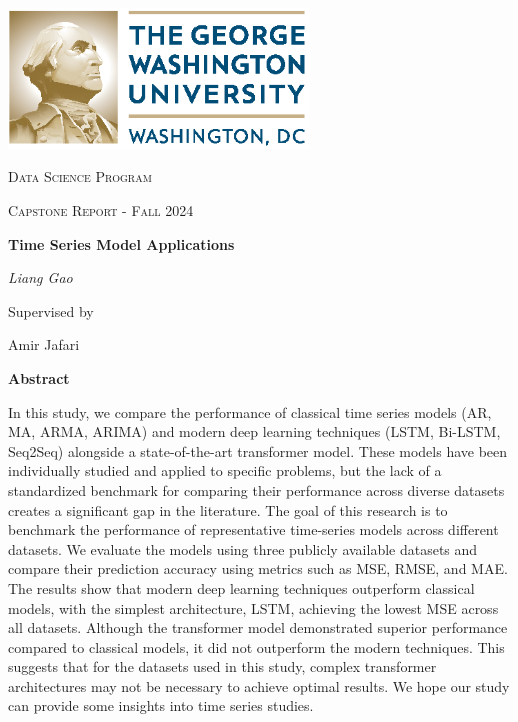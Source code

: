 \documentclass{scrartcl}
\renewenvironment{abstract}{
    \centering
    \textbf{Abstract}
    \vspace{0.5cm}
    \par\itshape
    \begin{minipage}{0.7\linewidth}}{\end{minipage}
    \noindent\ignorespaces
}
\begin{document}
\begin{titlepage}
	\centering
	\includegraphics[width=0.6\textwidth]{GW_logo.eps}\par
	\vspace{2cm}
	{\scshape\LARGE Data Science Program \par}
	\vspace{1cm}
	{\scshape\Large Capstone Report - Fall 2024\par}
	\vspace{1.5cm}
	{\huge\bfseries Time Series Model Applications \par}
	\vspace{2cm}
	{\Large\itshape Liang Gao}\par
	\vspace{1.5cm}
	Supervised by\par
	Amir Jafari


        \newpage

	\begin{abstract}
            In this study, we compare the performance of classical time series models (AR, MA, ARMA, ARIMA) and modern deep learning techniques (LSTM, Bi-LSTM, Seq2Seq) alongside a state-of-the-art transformer model. These models have been individually studied and applied to specific problems, but the lack of a standardized benchmark for comparing their performance across diverse datasets creates a significant gap in the literature. The goal of this research is to benchmark the performance of representative time-series models across different datasets. We evaluate the models using three publicly available datasets and compare their prediction accuracy using metrics such as MSE, RMSE, and MAE. The results show that modern deep learning techniques outperform classical models, with the simplest architecture, LSTM, achieving the lowest MSE across all datasets. Although the transformer model demonstrated superior performance compared to classical models, it did not outperform the modern techniques. This suggests that for the datasets used in this study, complex transformer architectures may not be necessary to achieve optimal results. We hope our study can provide some insights into time series studies. 
	\end{abstract}
	\vfill
\end{titlepage}
\tableofcontents
\newpage
\end{document}
